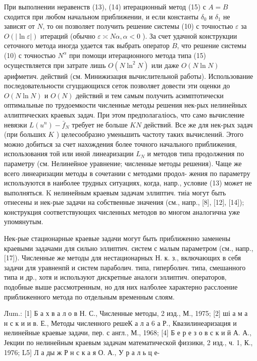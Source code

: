\documentclass[10pt]{article}
\begin{document}
При выполнении неравенств (13), (14) итерационный метод (15) с $A=B$ сходится при любом начальном приближении, и если константы $\delta_{0}$ и $\delta_{1}$ не зависят от $N$, то он позволяет получить решение системы (10) с точностью $\varepsilon$ за $O(|\ln \varepsilon|)$ итераций (обычно $\varepsilon \asymp N \alpha, \alpha<0$ ). За счет удачной конструкции сеточного метода иногда удается так выбрать оператор $B$, что решение системы (10) с точностью $N^{\alpha}$ при помощи итерационного метода типа (15) осуществляется при затрате лишь $O\left(N \ln ^{2} N\right)$ или даже $O(N \ln N)$ арифметич. действий (см. Минижизация вычислительной работы). Использование последовательности сгуццающихся сеток позволяет довести эти оценки до $O(N \ln N)$ и $O(N)$ действий и тем самым получить асимптотически оптимальные по трудоемкости численные методы решения нек-рых нелинейных әллиптических краевых задач. При этом предполагаліось, что само вычисление невязки $L\left(u^{n}\right)-\bar{f}_{N}$ требует не больше $K N$ действий. Все же для нек-рых задач (при больших $K$ ) целесообразно уменьшить частоту таких вычислений. Этого можно добиться за счет нахождения более точного начального приближения, использования той или иной линеаризации $L_{N}$ и методов типа продолжения по параметру (см. Нелинейное уравнение; численные методы решения). Чаще же всего линеаризации методы в сочетании с методами продол- жения по параметру используются в наиболее трудных ситуациях, когда, напр., условие (13) может не выполняться. K нелинейным краевым задачам эллиптич. тиіа могут быть отнесены и нек-рые задачи на собственные значения (см., напр., [8], [12], [14]); конструкция соответствующих численных методов во многом аналогична уже упомянутым.



Нек-рые стационарные краевые задачи могут быть приближенно заменены краевыми задачами для сильно эллиптич. систем с малым параметром (см., напр., [17]). Численные же методы для нестационарных Н. к. з., включающих в себя задачи для уравненпй и систем параболич. типа, гиперболич. типа, смешанного типа и др., хотя и используют дискретные аналоги эллиптич. операторов, подобные выше рассмотренным, но для них налболее характерно расслоение приближенного метода по отдельным временным слоям.



Лum.: [1] Б а х в а л о в Н. С., Численные методы, 2 изд., М., 1975; [2] ші а м а н с к и и в. Е., Методы численного решеК а л а 6 а Р., Квазилинеаризация и нелинейные краевые задачи, пер. с англ., М., 1968; [4] Б е р е з о в с к и й А. А., Јекции по нелинейным краевым задачам математической физзики, 2 изд., ч. 1, К., 1976; L5] Л а ды ж Р н с к а я О. А., У р а л ь ц е-
\end{document}

